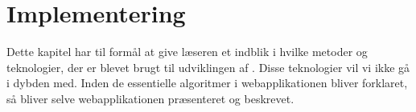 \chapter{Implementering}
\label{chap:implementering}
Dette kapitel har til formål at give læseren et indblik i hvilke metoder og teknologier, der er blevet brugt til udviklingen af \Foodl. Disse teknologier vil vi ikke gå i dybden med. Inden de essentielle algoritmer i webapplikationen bliver forklaret, så bliver selve webapplikationen præsenteret og beskrevet.



